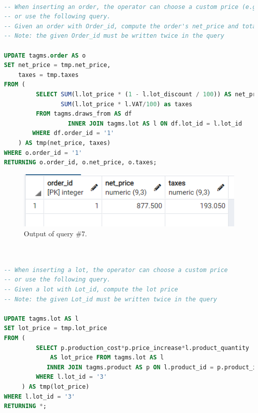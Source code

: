 \begin{lstlisting}[language=SQL,
	keywordstyle=\color{blue},
	stringstyle=\color{mauve},
	showstringspaces=false,
	breaklines=true,
	basicstyle=\ttfamily\footnotesize]

-- When inserting an order, the operator can choose a custom price (e.g., decided with the customer)
-- or use the following query.
-- Given an order with Order_id, compute the order's net_price and total taxes.
-- Note: the given Order_id must be written twice in the query

UPDATE tagms.order AS o
SET net_price = tmp.net_price,
    taxes = tmp.taxes
FROM (
         SELECT SUM(l.lot_price * (1 - l.lot_discount / 100)) AS net_price,
                SUM(l.lot_price * l.VAT/100) as taxes
         FROM tagms.draws_from AS df
                  INNER JOIN tagms.lot AS l ON df.lot_id = l.lot_id
        WHERE df.order_id = '1'
    ) AS tmp(net_price, taxes)
WHERE o.order_id = '1'
RETURNING o.order_id, o.net_price, o.taxes;

\end{lstlisting}

\begin{figure}[h!]
	\centering
	\includegraphics{images/q7}
	\caption{Output of query \#7.}
	\label{fig:q7}
\end{figure}

\begin{lstlisting}[language=SQL,
	keywordstyle=\color{blue},
	stringstyle=\color{mauve},
	showstringspaces=false,
	breaklines=true,
	basicstyle=\ttfamily\footnotesize]


-- When inserting a lot, the operator can choose a custom price
-- or use the following query.
-- Given a lot with Lot_id, compute the lot price
-- Note: the given Lot_id must be written twice in the query

UPDATE tagms.lot AS l
SET lot_price = tmp.lot_price
FROM (
         SELECT p.production_cost*p.price_increase*l.product_quantity
             AS lot_price FROM tagms.lot AS l
            INNER JOIN tagms.product AS p ON l.product_id = p.product_id
         WHERE l.lot_id = '3'
     ) AS tmp(lot_price)
WHERE l.lot_id = '3'
RETURNING *;

\end{lstlisting}

